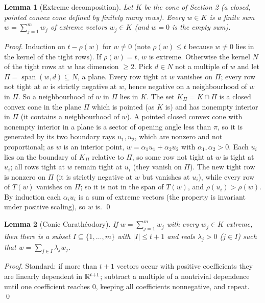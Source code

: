 \documentclass[11pt]{article}
\newtheorem{lemma}{Lemma}
\begin{document}
\begin{lemma}[Extreme decomposition]\label{lem:decomp}
Let $K$ be the cone of Section 2 (a closed, pointed convex cone defined by finitely many rows). Every $w\in K$ is a finite sum $w=\sum_{j=1}^{m}w_j$ of extreme vectors $w_j\in K$ (and $w=0$ is the empty sum).
\end{lemma}
\begin{proof}
Induction on $t-\rho(w)$ for $w\neq 0$ (note $\rho(w)\le t$ because $w\ne0$ lies in the kernel of the tight rows). If $\rho(w)=t$, $w$ is extreme. Otherwise the kernel $N$ of the tight rows at $w$ has dimension $\ge 2$. Pick $d\in N$ not a multiple of $w$ and let $\Pi=\operatorname{span}(w,d)\subseteq N$, a plane. Every row tight at $w$ vanishes on $\Pi$; every row not tight at $w$ is strictly negative at $w$, hence negative on a neighbourhood of $w$ in $\Pi$. So a neighbourhood of $w$ in $\Pi$ lies in $K$. The set $K_\Pi=K\cap\Pi$ is a closed convex cone in the plane $\Pi$ which is pointed (as $K$ is) and has nonempty interior in $\Pi$ (it contains a neighbourhood of $w$). A pointed closed convex cone with nonempty interior in a plane is a sector of opening angle less than $\pi$, so it is generated by its two boundary rays $u_1,u_2$, which are nonzero and not proportional; as $w$ is an interior point, $w=\alpha_1u_1+\alpha_2u_2$ with $\alpha_1,\alpha_2>0$. Each $u_i$ lies on the boundary of $K_\Pi$ relative to $\Pi$, so some row not tight at $w$ is tight at $u_i$; all rows tight at $w$ remain tight at $u_i$ (they vanish on $\Pi$). The new tight row is nonzero on $\Pi$ (it is strictly negative at $w$ but vanishes at $u_i$), while every row of $T(w)$ vanishes on $\Pi$; so it is not in the span of $T(w)$, and $\rho(u_i)>\rho(w)$. By induction each $\alpha_iu_i$ is a sum of extreme vectors (the property is invariant under positive scaling), so $w$ is. \qed
\end{proof}

\begin{lemma}[Conic Carath\'eodory]\label{lem:cara}
If $w=\sum_{j=1}^{m}w_j$ with every $w_j\in K$ extreme, then there is a subset $I\subseteq\{1,\dots,m\}$ with $|I|\le t+1$ and reals $\lambda_j>0$ ($j\in I$) such that $w=\sum_{j\in I}\lambda_jw_j$.
\end{lemma}
\begin{proof}
Standard: if more than $t+1$ vectors occur with positive coefficients they are linearly dependent in $\mathbb R^{t+1}$; subtract a multiple of a nontrivial dependence until one coefficient reaches $0$, keeping all coefficients nonnegative, and repeat. \qed
\end{proof}
\end{document}
